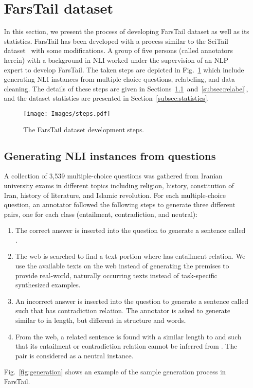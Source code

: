 \documentclass[preprint,12pt]{elsarticle}
\begin{document}
\section{FarsTail dataset}
\label{sec:farstail}
In this section, we present the process of developing FarsTail dataset as well as its statistics. FarsTail has been developed with a process similar to the SciTail dataset~\citep{khot2018scitail} with some modifications. A group of five persons (called annotators herein) with a background in NLI worked under the supervision of an NLP expert to develop FarsTail. The taken steps are depicted in Fig.~\ref{fig:farstail-steps} which include generating NLI instances from multiple-choice questions, relabeling, and data cleaning. The details of these steps are given in Sections~\ref{subsec:generate}~and~\ref{subsec:relabel}, and the dataset statistics are presented in Section~\ref{subsec:statistics}. 

\begin{figure}[t!]
    \centering
    \texttt{[image: Images/steps.pdf]}
    \caption{The FarsTail dataset development steps.}
    \label{fig:farstail-steps}
\end{figure}

\subsection{Generating NLI instances from questions}
\label{subsec:generate}
A collection of 3,539 multiple-choice questions was gathered from Iranian university exams in different topics including religion, history, constitution of Iran, history of literature, and Islamic revolution. For each multiple-choice question, an annotator followed the following steps to generate three different pairs, one for each class (entailment, contradiction, and neutral):
\begin{enumerate}
    \item The correct answer is inserted into the question to generate a sentence called . 
    \item The web is searched to find a text portion  where   has entailment relation. We use the available texts on the web instead of generating the premises to provide real-world, naturally occurring texts instead of task-specific synthesized examples. 
    \item An incorrect answer is inserted into the question to generate a sentence called  such that  has contradiction relation. The annotator is asked to generate  similar to  in length, but different in structure and words. 
    \item From the web, a related sentence  is found with a similar length to  and  such that its entailment or contradiction relation cannot be inferred from . The pair  is considered as a neutral instance.
\end{enumerate}
Fig.~\ref{fig:generation} shows an example of the sample generation process in FarsTail. 
\end{document}
